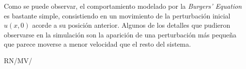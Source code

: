 \documentclass[spanish, fleqn]{article}
\begin{document}
    Como se puede observar, el comportamiento modelado por la \textit{Burgers' Equation} es bastante simple, consistiendo en un
    movimiento de la perturbación inicial $u(x,0)$ acorde a su posición anterior. Algunos de los detalles que pudieron 
    observarse en la simulación son la aparición de una perturbación más pequeña que parece moverse a menor velocidad que el
    resto del sistema.
    
\vfill\hfill RN/MV/\LaTeXe
\end{document}
